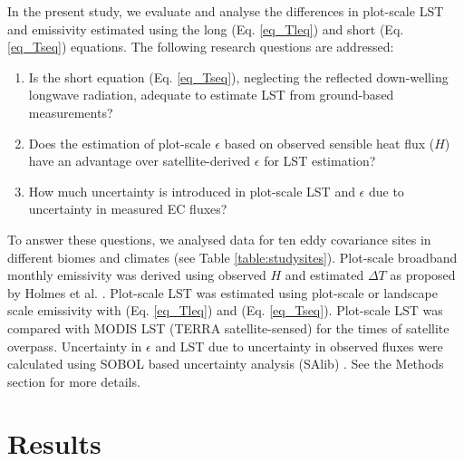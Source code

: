 \documentclass[fleqn,10pt]{wlscirep}
\begin{document}
In the present study, we evaluate and analyse the differences in plot-scale LST and emissivity estimated using the long (Eq. \ref{eq_Tleq}) and short (Eq. \ref{eq_Tseq}) equations. 
The following research questions are addressed:
\begin{enumerate}
	\item Is the short equation (Eq. \ref{eq_Tseq}), neglecting the reflected down-welling longwave radiation, adequate to estimate LST from ground-based measurements?
	\item Does the estimation of plot-scale $\epsilon$ based on observed sensible heat flux ($H$) have an advantage over satellite-derived $\epsilon$ for LST estimation?
    \item How much uncertainty is introduced in plot-scale LST and $\epsilon$ due to uncertainty in measured EC fluxes?
    
\end{enumerate}    
To answer these questions, we analysed data for ten eddy covariance sites in different biomes and climates (see Table \ref{table:studysites}).
Plot-scale broadband monthly emissivity was derived using observed $H$ and estimated $\Delta T$ as proposed by Holmes et al. \cite{holmes_land_2009}.  Plot-scale LST was estimated using plot-scale or landscape scale emissivity with (Eq. \ref{eq_Tleq}) and (Eq. \ref{eq_Tseq}). Plot-scale LST was compared with MODIS LST (TERRA satellite-sensed) for the times of satellite overpass. Uncertainty in $\epsilon$ and LST due to uncertainty in observed fluxes were calculated using SOBOL based uncertainty analysis (SAlib) \cite{rosolem2012fully}. %
See the Methods section for more details.

\section{Results}

\end{document}
